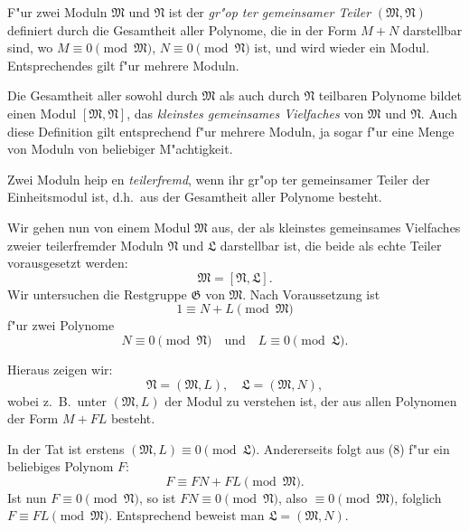 \documentclass[12pt,a4paper]{article}
\begin{document}
F"ur zwei Moduln $\mathfrak{M}$ und $\mathfrak{N}$ ist der \emph{gr"op ter gemeinsamer Teiler} $(\mathfrak{M}, \mathfrak{N})$ definiert durch die Gesamtheit aller Polynome, die in der Form $M + N$ darstellbar sind, wo $M \equiv 0 \pmod{\mathfrak{M}}$, $N \equiv 0 \pmod{\mathfrak{N}}$ ist, und wird wieder ein Modul. Entsprechendes gilt f"ur mehrere Moduln.

Die Gesamtheit aller sowohl durch $\mathfrak{M}$ als auch durch $\mathfrak{N}$ teilbaren Polynome bildet einen Modul $[\mathfrak{M}, \mathfrak{N}]$, das \emph{kleinstes gemeinsames Vielfaches} von $\mathfrak{M}$ und $\mathfrak{N}$. Auch diese Definition gilt entsprechend f"ur mehrere Moduln, ja sogar f"ur eine Menge von Moduln von beliebiger M"achtigkeit.

Zwei Moduln heip en \emph{teilerfremd}, wenn ihr gr"op ter gemeinsamer Teiler der Einheitsmodul ist, d.h.\ aus der Gesamtheit aller Polynome besteht.

Wir gehen nun von einem Modul $\mathfrak{M}$ aus, der als kleinstes gemeinsames Vielfaches zweier teilerfremder Moduln $\mathfrak{N}$ und $\mathfrak{L}$ darstellbar ist, die beide als echte Teiler vorausgesetzt werden:
\begin{equation}
\mathfrak{M} = [\mathfrak{N}, \mathfrak{L}]. \tag{7}
\end{equation}
Wir untersuchen die Restgruppe $\mathfrak{G}$ von $\mathfrak{M}$. Nach Voraussetzung ist
\begin{equation}
1 \equiv N + L \pmod{\mathfrak{M}} \tag{8}
\end{equation}
f"ur zwei Polynome
\begin{equation}
N \equiv 0 \pmod{\mathfrak{N}} \quad \text{und} \quad L \equiv 0 \pmod{\mathfrak{L}}. \tag{9}
\end{equation}

Hieraus zeigen wir:
\[
\mathfrak{N} = (\mathfrak{M}, L), \quad \mathfrak{L} = (\mathfrak{M}, N),
\]
wobei z.\ B.\ unter $(\mathfrak{M}, L)$ der Modul zu verstehen ist, der aus allen Polynomen der Form $M + FL$ besteht.

In der Tat ist erstens $(\mathfrak{M}, L) \equiv 0 \pmod{\mathfrak{L}}$. Andererseits folgt aus (8) f"ur ein beliebiges Polynom $F$:
\begin{equation}
F \equiv FN + FL \pmod{\mathfrak{M}}. \tag{10}
\end{equation}
Ist nun $F \equiv 0 \pmod{\mathfrak{N}}$, so ist $FN \equiv 0 \pmod{\mathfrak{N}}$, also $\equiv 0 \pmod{\mathfrak{M}}$, folglich $F \equiv FL \pmod{\mathfrak{M}}$. Entsprechend beweist man $\mathfrak{L} = (\mathfrak{M}, N)$.
\end{document}
